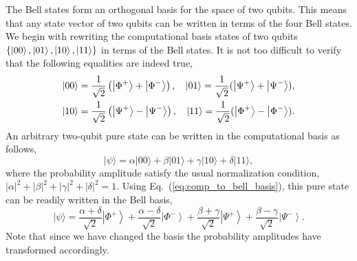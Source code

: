 The Bell states form an orthogonal basis for the space of two qubits.
This means that any state vector of two qubits can be written in terms of the four Bell states.
We begin with rewriting the computational basis states of two qubits $\{\left| 00 \right\rangle,\left| 01 \right\rangle,\left| 10 \right\rangle,\left| 11 \right\rangle\}$ in terms of the Bell states.
It is not too difficult to verify that the following equalities are indeed true,
\begin{equation}
    \begin{aligned}
    |00\rangle &=\frac{1}{\sqrt{2}}\left(\left|\Phi^{+}\right\rangle+\left|\Phi^{-}\right\rangle\right), & 
    \left| 01 \right\rangle = \frac{1}{\sqrt2}(\left| \Psi^{+} \right\rangle + \left| \Psi^{-} \right\rangle), \\
    |10\rangle &=\frac{1}{\sqrt{2}}\left(\left|\Psi^{+}\right\rangle-\left|\Psi^{-}\right\rangle\right), & 
    \left| 11 \right\rangle = \frac{1}{\sqrt2}(\left| \Phi^{+} \right\rangle - \left| \Phi^{-} \right\rangle).
    \label{eq:comp_to_bell_basis}
    \end{aligned}
\end{equation}
An arbitrary two-qubit pure state can be written in the computational basis as follows,
\begin{equation}
    |\psi\rangle=\alpha|00\rangle+\beta|01\rangle+\gamma|10\rangle+\delta|11\rangle,
\end{equation}
where the probability amplitude satisfy the usual normalization condition, $|\alpha|^2+|\beta|^2+|\gamma|^2+|\delta|^2=1$.
Using Eq.~(\ref{eq:comp_to_bell_basis}), this pure state can be readily written in the Bell basis,
\begin{equation}
    |\psi\rangle=\frac{\alpha+\delta}{\sqrt{2}}\left|\Phi^{+}\right\rangle+\frac{\alpha-\delta}{\sqrt{2}}\left|\Phi^{-}\right\rangle+\frac{\beta+\gamma}{\sqrt{2}}\left|\Psi^{+}\right\rangle+\frac{\beta-\gamma}{\sqrt{2}}\left|\Psi^{-}\right\rangle.
    \label{eq:psi_bell_basis}
\end{equation}
Note that since we have changed the basis the probability amplitudes have transformed accordingly.

